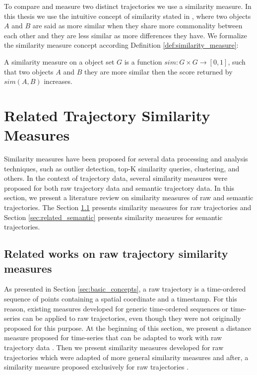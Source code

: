 To compare and measure two distinct trajectories we use a similarity measure. In this thesis we use the intuitive concept of similarity stated in \cite{lin1998information}, where two objects $A$ and $B$ are said as more similar when they share more commonality between each other and they are less similar as more differences they have. We formalize the similarity measure concept according Definition \ref{def:similarity_measure}:

\begin{definition}
\label{def:similarity_measure}
A similarity measure on a object set $G$ is a function $sim: G \times G \to [0,1]$, such that two objects $A$ and $B$ they are more similar then the score returned by $sim(A, B)$ increases.
\end{definition}

\section{Related Trajectory Similarity Measures} \label{sec:related_measures}

Similarity measures have been proposed for several data processing and analysis techniques, such as outlier detection, top-K similarity queries, clustering, and others. In the context of trajectory data, several similarity measures were proposed for both raw trajectory data and semantic trajectory data. In this section, we present a literature review on similarity measures of raw and semantic trajectories.
The Section \ref{sec:related_raw} presents similarity measures for raw trajectories and Section \ref{sec:related_semantic} presents similarity measures for semantic trajectories.


\subsection{Related works on raw trajectory similarity measures} \label{sec:related_raw}
{As presented in Section {\ref{sec:basic_concepts},} a raw trajectory is a time-ordered sequence of points containing a spatial coordinate and a timestamp. For this reason, existing measures developed for generic time-ordered sequences or time-series can be applied to raw trajectories, even though they were not originally proposed for this purpose. At the beginning of this section, we present a distance measure proposed for time-series }\cite{berndt1994using}{ that can be adapted to work with raw trajectory data }\cite{ten2007multi}{. Then we present similarity measures developed for raw trajectories which were adapted of more general similarity measures }\cite{eiter1994computing, Ding:2008:ESJ:1440463.1440989, vlachos2002discovering, Chen:2004:MLE:1316689.1316758, Chen:2005:RFS:1066157.1066213}{ and after, a similarity measure proposed exclusively for raw trajectories }\cite{Furtado-UMS-2018}.

